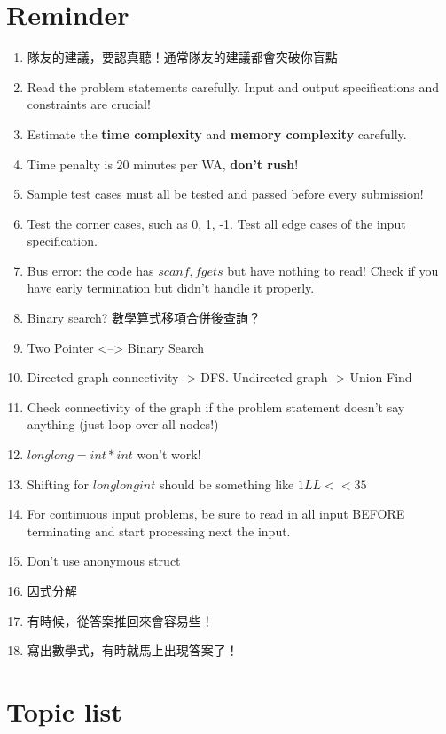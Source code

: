 \documentclass[10pt,oneside]{article}
\begin{document}
\begin{landscape}
\begin{multicols}{2}

\section{Reminder}

\begin{enumerate}
	\item 隊友的建議，要認真聽！通常隊友的建議都會突破你盲點
	\item Read the problem statements carefully. Input and output specifications and constraints are crucial!
	\item Estimate the \textbf{time complexity} and \textbf{memory complexity} carefully.
	\item Time penalty is 20 minutes per WA, \textbf{don't rush}!
	\item Sample test cases must all be tested and passed before every submission!
	\item Test the corner cases, such as 0, 1, -1. Test all edge cases of the input specification.
	\item Bus error: the code has $scanf, fgets$ but have nothing to read! Check if you have early termination but didn't handle it properly.
	\item Binary search? 數學算式移項合併後查詢？
	\item Two Pointer <--> Binary Search
	\item Directed graph connectivity -> DFS. Undirected graph -> Union Find
	\item Check connectivity of the graph if the problem statement doesn't say anything (just loop over all nodes!)
	\item $long long = int * int$ won't work!
	\item Shifting for $long long int$ should be something like $1LL << 35$
	\item For continuous input problems, be sure to read in all input BEFORE terminating and start processing next the input.
	\item Don't use anonymous struct
	\item 因式分解
	\item 有時候，從答案推回來會容易些！
	\item 寫出數學式，有時就馬上出現答案了！ %
\end{enumerate}

\section{Topic list}


\end{multicols}
\end{landscape}
\end{document}
